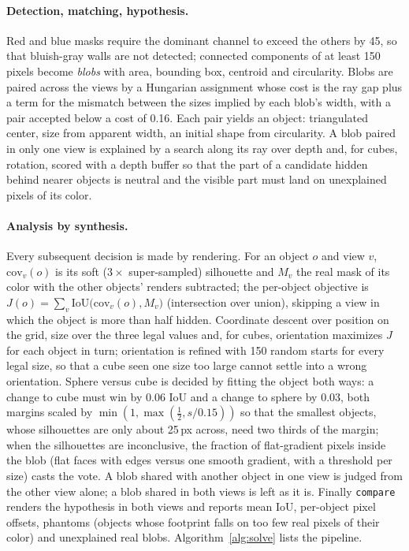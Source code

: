 \documentclass[10pt,a4paper]{article}
\begin{document}
\paragraph{Detection, matching, hypothesis.}
Red and blue masks require the dominant channel to exceed the others by 45, so that bluish-gray walls are not detected; connected components of at least 150 pixels become \emph{blobs} with area, bounding box, centroid and circularity. Blobs are paired across the views by a Hungarian assignment whose cost is the ray gap plus a term for the mismatch between the sizes implied by each blob's width, with a pair accepted below a cost of 0.16. Each pair yields an object: triangulated center, size from apparent width, an initial shape from circularity. A blob paired in only one view is explained by a search along its ray over depth and, for cubes, rotation, scored with a depth buffer so that the part of a candidate hidden behind nearer objects is neutral and the visible part must land on unexplained pixels of its color.

\paragraph{Analysis by synthesis.}
Every subsequent decision is made by rendering. For an object $o$ and view $v$, $\mathrm{cov}_v(o)$ is its soft ($3\times$ super-sampled) silhouette and $M_v$ the real mask of its color with the other objects' renders subtracted; the per-object objective is $J(o)=\sum_v \mathrm{IoU}\big(\mathrm{cov}_v(o),M_v\big)$ (intersection over union), skipping a view in which the object is more than half hidden. Coordinate descent over position on the grid, size over the three legal values and, for cubes, orientation maximizes $J$ for each object in turn; orientation is refined with 150 random starts for every legal size, so that a cube seen one size too large cannot settle into a wrong orientation. Sphere versus cube is decided by fitting the object both ways: a change to cube must win by 0.06 IoU and a change to sphere by 0.03, both margins scaled by $\min(1,\max(\tfrac12, s/0.15))$ so that the smallest objects, whose silhouettes are only about 25\,px across, need two thirds of the margin; when the silhouettes are inconclusive, the fraction of flat-gradient pixels inside the blob (flat faces with edges versus one smooth gradient, with a threshold per size) casts the vote. A blob shared with another object in one view is judged from the other view alone; a blob shared in both views is left as it is. Finally \texttt{compare} renders the hypothesis in both views and reports mean IoU, per-object pixel offsets, phantoms (objects whose footprint falls on too few real pixels of their color) and unexplained real blobs. Algorithm~\ref{alg:solve} lists the pipeline.
\end{document}
